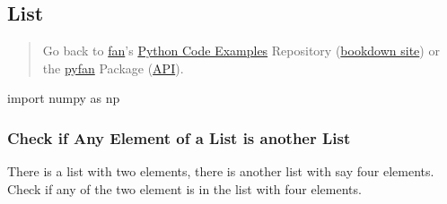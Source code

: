 \documentclass[
]{book}
\newenvironment{Shaded}{\begin{snugshade}}{\end{snugshade}}
\newcommand{\ImportTok}[1]{#1}
\newcommand{\NormalTok}[1]{#1}
\begin{document}
\hypertarget{list}{%
\subsection{List}\label{list}}

\begin{quote}
Go back to \href{http://fanwangecon.github.io/}{fan}'s \href{https://fanwangecon.github.io/Py4Econ/}{Python Code Examples} Repository (\href{https://fanwangecon.github.io/Py4Econ/bookdown}{bookdown site}) or the \href{https://pyfan.readthedocs.io/en/latest/}{pyfan} Package (\href{https://pyfan.readthedocs.io/en/latest/reference.html}{API}).
\end{quote}

\begin{Shaded}
\begin{Highlighting}[]
\ImportTok{import}\NormalTok{ numpy }\ImportTok{as}\NormalTok{ np}
\end{Highlighting}
\end{Shaded}

\hypertarget{check-if-any-element-of-a-list-is-another-list}{%
\subsubsection{Check if Any Element of a List is another List}\label{check-if-any-element-of-a-list-is-another-list}}

There is a list with two elements, there is another list with say four elements. Check if any of the two element is in the list with four elements.
\end{document}
